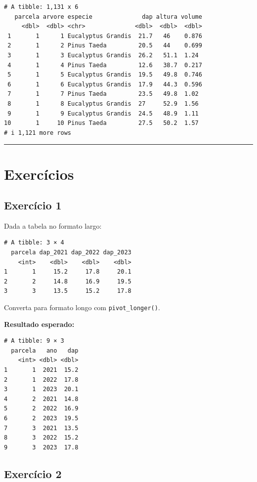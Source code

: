 \documentclass[
  letterpaper,
]{scrbook}
\begin{document}
\begin{verbatim}
# A tibble: 1,131 x 6
   parcela arvore especie              dap altura volume
     <dbl>  <dbl> <chr>              <dbl>  <dbl>  <dbl>
 1       1      1 Eucalyptus Grandis  21.7   46    0.876
 2       1      2 Pinus Taeda         20.5   44    0.699
 3       1      3 Eucalyptus Grandis  26.2   51.1  1.24 
 4       1      4 Pinus Taeda         12.6   38.7  0.217
 5       1      5 Eucalyptus Grandis  19.5   49.8  0.746
 6       1      6 Eucalyptus Grandis  17.9   44.3  0.596
 7       1      7 Pinus Taeda         23.5   49.8  1.02 
 8       1      8 Eucalyptus Grandis  27     52.9  1.56 
 9       1      9 Eucalyptus Grandis  24.5   48.9  1.11 
10       1     10 Pinus Taeda         27.5   50.2  1.57 
# i 1,121 more rows
\end{verbatim}

\begin{center}\rule{0.5\linewidth}{0.5pt}\end{center}

\section{Exercícios}\label{exercuxedcios-13}

\subsection{Exercício 1}\label{exercuxedcio-1-12}

Dada a tabela no formato largo:

\begin{verbatim}
# A tibble: 3 × 4
  parcela dap_2021 dap_2022 dap_2023
    <int>    <dbl>    <dbl>    <dbl>
1       1     15.2     17.8     20.1
2       2     14.8     16.9     19.5
3       3     13.5     15.2     17.8
\end{verbatim}

Converta para formato longo com \texttt{pivot\_longer()}.

\textbf{Resultado esperado:}

\begin{verbatim}
# A tibble: 9 × 3
  parcela   ano   dap
    <int> <dbl> <dbl>
1       1  2021  15.2
2       1  2022  17.8
3       1  2023  20.1
4       2  2021  14.8
5       2  2022  16.9
6       2  2023  19.5
7       3  2021  13.5
8       3  2022  15.2
9       3  2023  17.8
\end{verbatim}

\subsection{Exercício 2}\label{exercuxedcio-2-12}
\end{document}
